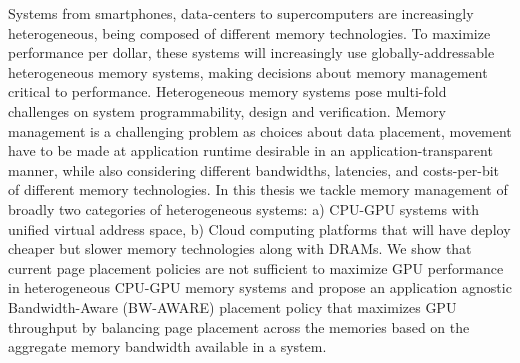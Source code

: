 Systems from smartphones, data-centers to supercomputers are increasingly
heterogeneous, being composed of different memory technologies. To maximize
performance per dollar, these systems will increasingly use globally-addressable
heterogeneous memory systems, making decisions about memory management critical
to performance. Heterogeneous memory systems pose multi-fold challenges on
system programmability, design and verification. Memory management is a
challenging problem as choices about data placement, movement have to be made at
application runtime desirable in an application-transparent manner, while also
considering different bandwidths, latencies, and costs-per-bit of different
memory technologies. In this thesis we tackle memory management of broadly two
categories of heterogeneous systems: a) CPU-GPU systems with unified virtual
address space, b) Cloud computing platforms that will have deploy cheaper but
slower memory technologies along with DRAMs.
We show that current page placement policies are not sufficient to maximize GPU
performance in heterogeneous CPU-GPU memory systems and propose an application
agnostic Bandwidth-Aware (BW-AWARE) placement policy that maximizes GPU
throughput by balancing page placement across the memories based on the
aggregate memory bandwidth available in a system.
%
